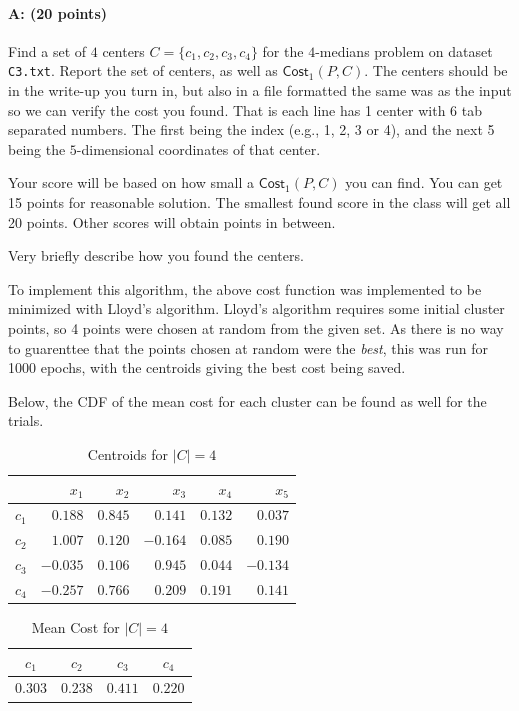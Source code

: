 \documentclass[11pt]{article}
\begin{document}
\paragraph{A: (20 points)}
Find a set of $4$ centers $C = \{c_1, c_2, c_3, c_4\}$ for the $4$-medians problem on dataset \texttt{C3.txt}.  Report the set of centers, as well as $\textsf{Cost}_1(P,C)$.  The centers should be in the write-up you turn in, but also in a file formatted the same was as the input so we can verify the cost you found.  That is each line has 1 center with 6 tab separated numbers.  The first being the index (e.g., 1, 2, 3 or 4), and the next 5 being the $5$-dimensional coordinates of that center.  

Your score will be based on how small a $\textsf{Cost}_1(P,C)$ you can find.   You can get 15 points for reasonable solution.  The smallest found score in the class will get all 20 points.  Other scores will obtain points in between.  

Very briefly describe how you found the centers.  

To implement this algorithm, the above cost function was implemented to be minimized with Lloyd's algorithm. Lloyd's algorithm requires some initial cluster points, so 4 points were chosen at random from the given set. As there is no way to guarenttee that the points chosen at random were the {\em best}, this was run for 1000 epochs, with the centroids giving the best cost being saved.

Below, the CDF of the mean cost for each cluster can be found as well for the trials. 


\begin{table}[H]
\centering
\caption{Centroids for $\left| C \right| = 4$}
\begin{tabular}{c | r r r r r}
\hline\hline
 & $x_{1}$ & $x_{2}$ & $x_{3}$ & $x_{4}$ & $x_{5}$\\
\hline
$c_{1}$ & $0.188$ & $0.845$ & $0.141$ & $0.132$ & $0.037$\\
$c_{2}$ & $1.007$ & $0.120$ & $-0.164$ & $0.085$ & $0.190$\\
$c_{3}$ & $-0.035$ & $0.106$ & $0.945$ & $0.044$ & $-0.134$\\
$c_{4}$ & $-0.257$ & $0.766$ & $0.209$ & $0.191$ & $0.141$\\
\hline
\end{tabular}
\end{table}

\begin{table}[H]
\centering
\caption{Mean Cost for $\left| C \right| = 4$}
\begin{tabular}{c c c c}
\hline\hline
$c_{1}$ & $c_{2}$ & $c_{3}$ & $c_{4}$\\
\hline
$0.303$ & $0.238$ & $0.411$ & $0.220$\\
\hline
\end{tabular}
\end{table}
\end{document}

